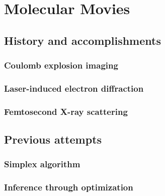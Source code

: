 \chapter{Molecular Movies}\label{ch:MolecularMovies}

\section{History and accomplishments}

\subsection{Coulomb explosion imaging}
\subsection{Laser-induced electron diffraction}
\subsection{Femtosecond X-ray scattering}

\section{Previous attempts}
\subsection{Simplex algorithm}
\subsection{Inference through optimization}
